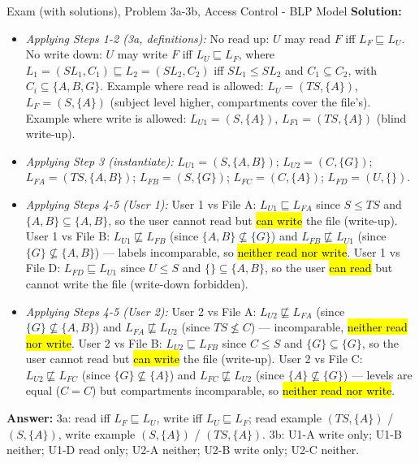 \documentclass[12pt, a4paper]{article}
\newcommand{\imp}[1]{\hl{#1}}                       %
\begin{document}
\begin{practicebox}{Exam (with solutions), Problem 3a-3b, Access Control - BLP Model}
\textbf{Solution:}
\begin{itemize}
    \item \textit{Applying Steps 1-2 (3a, definitions):} No read up: $U$ may read $F$ iff $L_F \sqsubseteq L_U$. No write down: $U$ may write $F$ iff $L_U \sqsubseteq L_F$, where $L_1 = (SL_1, C_1) \sqsubseteq L_2 = (SL_2, C_2)$ iff $SL_1 \leq SL_2$ and $C_1 \subseteq C_2$, with $C_i \subseteq \{A, B, G\}$. Example where read is allowed: $L_U = (TS, \{A\})$, $L_F = (S, \{A\})$ (subject level higher, compartments cover the file's). Example where write is allowed: $L_{U1} = (S, \{A\})$, $L_{F1} = (TS, \{A\})$ (blind write-up).
    \item \textit{Applying Step 3 (instantiate):} $L_{U1} = (S, \{A, B\})$; $L_{U2} = (C, \{G\})$; $L_{FA} = (TS, \{A, B\})$; $L_{FB} = (S, \{G\})$; $L_{FC} = (C, \{A\})$; $L_{FD} = (U, \{\})$.
    \item \textit{Applying Steps 4-5 (User 1):} User 1 vs File A: $L_{U1} \sqsubseteq L_{FA}$ since $S \leq TS$ and $\{A,B\} \subseteq \{A,B\}$, so the user cannot read but \imp{can write} the file (write-up). User 1 vs File B: $L_{U1} \not\sqsubseteq L_{FB}$ (since $\{A,B\} \not\subseteq \{G\}$) and $L_{FB} \not\sqsubseteq L_{U1}$ (since $\{G\} \not\subseteq \{A,B\}$) --- labels incomparable, so \imp{neither read nor write}. User 1 vs File D: $L_{FD} \sqsubseteq L_{U1}$ since $U \leq S$ and $\{\} \subseteq \{A,B\}$, so the user \imp{can read} but cannot write the file (write-down forbidden).
    \item \textit{Applying Steps 4-5 (User 2):} User 2 vs File A: $L_{U2} \not\sqsubseteq L_{FA}$ (since $\{G\} \not\subseteq \{A,B\}$) and $L_{FA} \not\sqsubseteq L_{U2}$ (since $TS \not\leq C$) --- incomparable, \imp{neither read nor write}. User 2 vs File B: $L_{U2} \sqsubseteq L_{FB}$ since $C \leq S$ and $\{G\} \subseteq \{G\}$, so the user cannot read but \imp{can write} the file (write-up). User 2 vs File C: $L_{U2} \not\sqsubseteq L_{FC}$ (since $\{G\} \not\subseteq \{A\}$) and $L_{FC} \not\sqsubseteq L_{U2}$ (since $\{A\} \not\subseteq \{G\}$) --- levels are equal ($C = C$) but compartments incomparable, so \imp{neither read nor write}.
\end{itemize}
\textbf{Answer:} 3a: read iff $L_F \sqsubseteq L_U$, write iff $L_U \sqsubseteq L_F$; read example $(TS,\{A\})$ / $(S,\{A\})$, write example $(S,\{A\})$ / $(TS,\{A\})$. 3b: U1-A write only; U1-B neither; U1-D read only; U2-A neither; U2-B write only; U2-C neither.
\end{practicebox}
\end{document}
